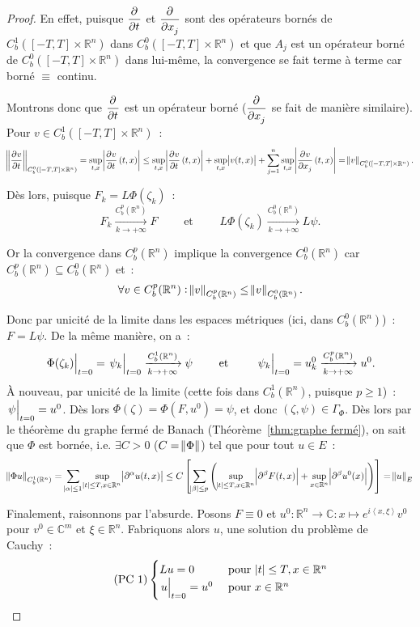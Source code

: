\documentclass{report}
\newcommand{\C}{{\mathbb C}}
\newcommand{\R}{{\mathbb R}}
\newcommand{\scpr}[2]{\left\langle#1, #2\right\rangle}
\newcommand{\pinfty}{{+\infty}}
\newcommand{\restr}[2]{\left.#1\vphantom{\big|}\right|_{#2}}
\theoremstyle{definition}
\theoremstyle{remark}
\begin{document}
\begin{proof}
En effet, puisque $\dpd {}t$ et $\dpd {}{x_j}$ sont des opérateurs bornés de $C^1_b([-T, T] \times \R^n)$ dans $C^0_b([-T, T] \times \R^n)$ et que $A_j$
est un opérateur borné de $C^0_b([-T, T] \times \R^n)$ dans lui-même, la convergence se fait terme à terme car borné $\equiv$ continu.

Montrons donc que $\dpd {}t$ est un opérateur borné ($\dpd {}{x_j}$ se fait de manière similaire). Pour $v \in C^1_b([-T, T] \times \R^n)$~:
\[\norm {\dpd vt}_{C^0_b([-T, T] \times \R^n)} = \sup_{t,x}\abs {\dpd vt(t, x)}
\leq \sup_{t,x}\abs {\dpd vt(t, x)} + \sup_{t,x}\abs {v(t, x)} + \sum_{j=1}^n\sup_{t,x}\abs {\dpd v{x_j}(t,x)} = \norm v_{C^0_b([-T, T] \times \R^n)}.\]

Dès lors, puisque $F_k = L\Phi(\zeta_k)$~:
\[F_k \xrightarrow[k \to \pinfty]{C^p_b(\R^n)} F \qquad \text{ et } \qquad L\Phi(\zeta_k) \xrightarrow[k \to \pinfty]{C^0_b(\R^n)} L\psi.\]

Or la convergence dans $C^p_b(\R^n)$ implique la convergence $C^0_b(\R^n)$ car $C^p_b(\R^n) \subseteq C^0_b(\R^n)$ et~:
\[\forall v \in C^p_b(\R^n) : \norm v_{C^p_b(\R^n)} \leq \norm v_{C^0_b(\R^n)}.\]

Donc par unicité de la limite dans les espaces métriques (ici, dans $C^0_b(\R^n)$)~: $F = L\psi$. De la même manière, on a~:
\[\restr{\Phi(\zeta_k)}{t=0} = \restr {\psi_k}{t=0} \xrightarrow[k \to \pinfty]{C^1_b(\R^n)} \psi \qquad \text{ et } \qquad \restr {\psi_k}{t=0} = u^0_k \xrightarrow[k \to \pinfty]{C^p_b(\R^n)} u^0.\]
À nouveau, par unicité de la limite (cette fois dans $C^1_b(\R^n)$, puisque $p \geq 1$)~: $\restr {\psi}{t=0} = u^0$. Dès lors $\Phi(\zeta) = \Phi(F, u^0) = \psi$, et donc
$(\zeta, \psi) \in \Gamma_\Phi$. Dès lors par le théorème du graphe fermé de Banach (Théorème~\ref{thm:graphe fermé}), on sait que $\Phi$ est bornée, i.e. $\exists C > 0$
($C = \norm \Phi$) tel que pour tout $u \in E$~:
\begin{equation}\label{eq:Phi bornée}
	\norm {\Phi u}_{C^1_b(\R^n)} = \sum_{\abs \alpha \leq 1}\sup_{\abs t \leq T,x \in \R^n}\abs {\partial^\alpha u(t, x)}
		\leq C\left[\sum_{\abs {\beta} \leq p}\left(\sup_{\abs t \leq T, x \in \R^n}\abs {\partial^\beta F(t, x)} + \sup_{x \in \R^n}\abs {\partial^\beta u^0(x)}\right)\right]
		= \norm {u}_E
\end{equation}

Finalement, raisonnons par l'absurde. Posons $F \equiv 0$ et $u^0 : \R^n \to \C : x \mapsto e^{i\scpr x\xi}v^0$ pour $v^0 \in \C^m$ et $\xi \in \R^n$. Fabriquons alors $u$, une
solution du problème de Cauchy~:
\begin{equation}\label{eq:PC 1 Petrowsky}\tag{PC~1}
	\begin{cases}
		Lu = 0 &\text{ pour } \abs t \leq T, x \in \R^n \\
		\restr u{t=0} = u^0 &\text{ pour } x \in \R^n
	\end{cases}
\end{equation}


\end{proof}
\end{document}
